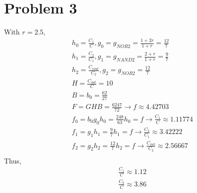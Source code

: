 \documentclass[a4paper,10pt]{article}
\begin{document}
\section*{Problem 3}
With \begin{math}r=2.5\end{math}, 
\begin{equation}
\begin{split}
&h_0=\frac{C_1}{C}, g_0=g_{NOR2}=\frac{1+2r}{1+r}=\frac{12}{7}\\
&h_1=\frac{C_2}{C_1}, g_1=g_{NAND2}=\frac{2+r}{1+r}=\frac{9}{7}\\
&h_2=\frac{C_{cout}}{C_2}, g_2=g_{NOR2}=\frac{12}{7}\\
&H=\frac{C_{out}}{C}=10\\
&B=b_0=\frac{62}{27}\\
&F=GHB=\frac{6247}{72}\rightarrow f\approx 4.42703\\
&f_0=b_0 g_0 h_0 = \frac{248}{63}h_0 =f\rightarrow \frac{C_1}{C}\approx 1.11774\\
&f_1=g_1 h_1 =\frac{9}{7}h_1 =f\rightarrow \frac{C_2}{C_1}\approx 3.42222\\
&f_2=g_2 h_2 =\frac{12}{7}h_2=f\rightarrow\frac{C_{out}}{C_2}\approx 2.56667\\
\end{split}
\end{equation}
Thus, 
\begin{equation}
 \begin{split}
  &\frac{C_1}{C}\approx 1.12\\
  &\frac{C_2}{C}\approx 3.86
 \end{split}
\end{equation}
\end{document}
